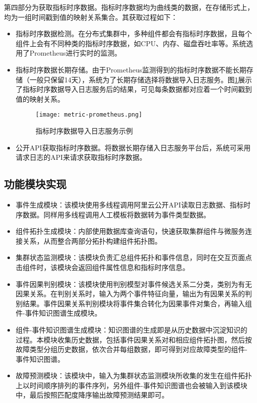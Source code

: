 第四部分为获取指标时序数据。指标时序数据均为曲线类的数据，在存储形式上，均为一组时间戳到值的映射关系集合。其获取过程如下：
\begin{itemize}
    \item [（1）]指标时序数据检测。在分布式集群中，多种组件都会有指标时序数据，且每个组件上会有不同种类的指标时序数据，如CPU、内存、磁盘吞吐率等。系统选用了Prometheus进行实时的监测。
    \item [（2）]指标时序数据长期存储。由于Prometheus监测得到的指标时序数据不能长期存储（一般只保留14天），系统为了长期存储选择将数据导入日志服务。图\ref{metric-prometheus}展示了指标时序数据导入日志服务后的结果，可见每条数据都对应着一个时间戳到值的映射关系。
    \begin{figure}[htbp]
        \centering
        \texttt{[image: metric-prometheus.png]}
        \caption{指标时序数据导入日志服务示例\label{metric-prometheus}}
    \end{figure}
    \item [（3）]公开API获取指标时序数据。将数据长期存储入日志服务平台后，系统可采用请求日志的API来请求获取指标时序数据。
\end{itemize}

\subsection{功能模块实现}

\begin{itemize}
    \item [（1）]事件生成模块：该模块使用多线程调用阿里云公开API读取日志数据、指标时序数据。同样用多线程调用人工模板将数据转为事件类型数据。
    \item [（2）]组件拓扑生成模块：内部使用数据库查询语句，快速获取集群组件与微服务连接关系，从而整合两部分拓扑构建组件拓扑图。
    \item [（3）]集群状态监测模块：该模块负责汇总组件拓扑和事件信息，同时在交互页面点击组件时，该模块会返回组件属性信息和指标时序信息。
    \item [（4）]事件因果判别模块：该模块使用判别模型对事件候选关系二分类，类别为有无因果关系。在判别关系时，输入为两个事件特征向量，输出为有因果关系的判别结果。事件因果关系判别模块将事件集合转化为因果事件对集合，再输入组件-事件知识图谱生成模块。
    \item [（5）]组件-事件知识图谱生成模块：知识图谱的生成即是从历史数据中沉淀知识的过程。本模块收集历史数据，包括事件因果关系对和相应组件拓扑图，然后按故障类型分组历史数据，依次合并每组数据，即可得到对应故障类型的组件-事件知识图谱。
    \item [（6）]故障预测模块：该模块中，输入为集群状态监测模块所收集的发生在组件拓扑上以时间顺序排列的事件序列，另外组件-事件知识图谱也会被输入到该模块中，最后按照匹配度降序输出故障预测结果即可。
\end{itemize}


